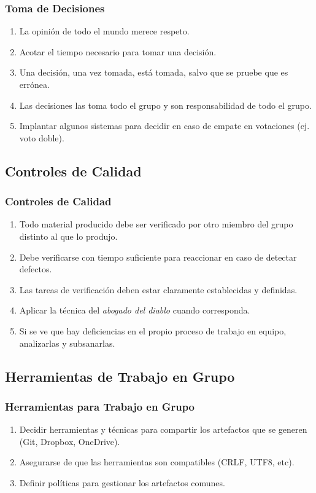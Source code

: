 \documentclass[a4paper,slidestop,xcolor=pst,dvips,blue]{beamer}
\begin{document}
\begin{frame}[c]
	\frametitle{Toma de Decisiones}
	\begin{enumerate}[<+->]
		\item La opinión de todo el mundo merece respeto.
		\item Acotar el tiempo necesario para tomar una decisión.
		\item Una decisión, una vez tomada, está tomada, salvo que se pruebe que es errónea.
		\item Las decisiones las toma todo el grupo y son responsabilidad de todo el grupo.
		\item Implantar algunos sistemas para decidir en caso de empate en votaciones (ej. voto doble).
	\end{enumerate}
\end{frame}

\subsection{Controles de Calidad}

\begin{frame}[c]
	\frametitle{Controles de Calidad}
	\begin{enumerate}[<+->]
		\item Todo material producido debe ser verificado por otro miembro del grupo distinto al que lo produjo.
		\item Debe verificarse con tiempo suficiente para reaccionar en caso de detectar defectos.
		\item Las tareas de verificación deben estar claramente establecidas y definidas.
		\item Aplicar la técnica del \emph{abogado del diablo} cuando corresponda.
		\item Si se ve que hay deficiencias en el propio proceso de trabajo en equipo, analizarlas y subsanarlas.
	\end{enumerate}
\end{frame}

\subsection{Herramientas de Trabajo en Grupo}

\begin{frame}[c]
	\frametitle{Herramientas para Trabajo en Grupo}
	\begin{enumerate}[<+->]
		\item Decidir herramientas y técnicas para compartir los artefactos que se generen (Git, Dropbox, OneDrive).
		\item Asegurarse de que las herramientas son compatibles (CRLF, UTF8, etc).
		\item Definir políticas para gestionar los artefactos comunes.
	\end{enumerate}
\end{frame}
\end{document}
